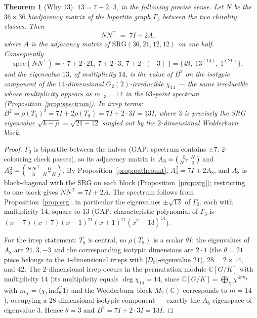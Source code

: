 \documentclass[11pt]{article}
\newtheorem{theorem}{Theorem}[section]
\theoremstyle{definition}
\newcommand{\C}{\mathbb{C}}
\begin{document}
\begin{theorem}[Why 13]\label{thm:why13}
$13 = 7 + 2\cdot 3$, in the following precise sense. Let $N$ be the
$36\times 36$ biadjacency matrix of the bipartite graph $\Gamma_3$ between
the two chirality classes. Then
\[
N N^\top \;=\; 7I + 2A,
\]
where $A$ is the adjacency matrix of $\mathrm{SRG}(36,21,12,12)$ on one
half. Consequently
\[
\mathrm{spec}(NN^\top) = \{\,7 + 2\cdot 21,\ 7 + 2\cdot 3,\ 7 + 2\cdot(-3)\,\}
= \{49,\ 13^{(14)},\ 1^{(21)}\},
\]
and the eigenvalue $13$, of multiplicity $14$, is the value of $B^2$ on the
isotypic component of the $14$-dimensional $G_2(2)$-irreducible $\chi_{14}$
--- the same irreducible whose multiplicity appears as $m_{-3} = 14$ in the
$63$-point spectrum (Proposition~\ref{prop:spectrum}). In irrep terms:
$B^2 = \rho(T_3)^2 = 7I + 2\rho(T_8) = 7I + 2\cdot 3I = 13I$, where
$3$ is precisely the SRG eigenvalue $\sqrt{k - \mu} = \sqrt{21-12}$ singled
out by the $2$-dimensional Wedderburn block.
\end{theorem}

\begin{proof}
$\Gamma_3$ is bipartite between the halves (GAP: spectrum contains $\pm 7$;
2-colouring check passes), so its adjacency matrix is
$A_3 = \begin{psmallmatrix}0 & N\\ N^\top & 0\end{psmallmatrix}$ and
$A_3^2 = \begin{psmallmatrix}NN^\top & 0\\ 0& N^\top N\end{psmallmatrix}$.
By Proposition~\ref{prop:pathcount}, $A_3^2 = 7I + 2A_8$, and $A_8$ is
block-diagonal with the SRG on each block
(Proposition~\ref{prop:srg}); restricting to one block gives
$NN^\top = 7I + 2A$. The spectrum follows from
Proposition~\ref{prop:srg}; in particular the eigenvalues $\pm\sqrt{13}$ of
$\Gamma_3$, each with multiplicity $14$, square to $13$
(GAP: characteristic polynomial of $\Gamma_3$ is
$(x{-}7)(x{+}7)(x{-}1)^{21}(x{+}1)^{21}(x^2-13)^{14}$).

For the irrep statement: $T_8$ is central, so $\rho(T_8)$ is a scalar
$\theta I$; the eigenvalues of $A_8$ are $21, 3, -3$ and the corresponding
isotypic dimensions are $2\cdot 1$ (the $\theta = 21$ piece belongs to the
$1$-dimensional irreps with $|D_8|$-eigenvalue $21$), $28 = 2\times 14$, and
$42$. The $2$-dimensional irrep occurs in the permutation module
$\C[G/K]$ with multiplicity $14$ (its multiplicity equals
$\deg\chi_{14} = 14$, since
$\C[G/K] = \bigoplus_\chi \chi^{\oplus m_\chi}$ with
$m_\chi = \langle \chi, \mathrm{ind}_K^G 1\rangle$ and the Wedderburn block
$M_2(\C)$ corresponds to $m = 14$), occupying a $28$-dimensional isotypic
component --- exactly the $A_8$-eigenspace of eigenvalue $3$. Hence
$\theta = 3$ and $B^2 = 7I + 2\cdot 3I = 13I$.
\end{proof}
\end{document}
